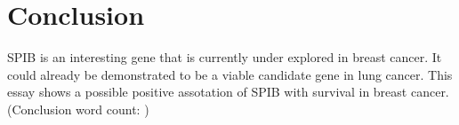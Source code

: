 \section{Conclusion}
\countem
SPIB is an interesting gene that is currently under explored in breast cancer.
It could already be demonstrated to be a viable candidate gene in lung cancer.
This essay shows a possible positive assotation of SPIB with survival in breast cancer.
\\
\endcountem 
(Conclusion word count: \thewordcount{})